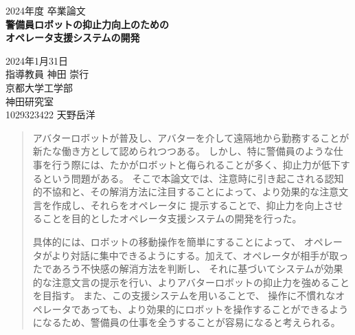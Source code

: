\documentclass[11pt,a4j]{jreport}
\begin{document}
\thispagestyle{empty}
\begin{center}

\vspace{20mm}
{\Large\noindent 2024年度 卒業論文}\\
\vspace{40mm}
{\huge\noindent\textbf{警備員ロボットの抑止力向上のための}}\\
\medskip
{\huge\noindent\textbf{オペレータ支援システムの開発}}\\
\vspace{\baselineskip}
\vspace{40mm}

{\Large\noindent
2024年1月31日\\
\vspace{\baselineskip}
指導教員 神田  崇行\\
\vspace{\baselineskip}
京都大学工学部\\
神田研究室\\
\vspace{\baselineskip}
1029323422 天野岳洋\\
}
\vspace{40mm}

\end{center}

\thispagestyle{empty}
\clearpage

\renewcommand{\abstractname}{要旨}

\begin{abstract}


アバターロボットが普及し、アバターを介して遠隔地から勤務することが新たな働き方として認められつつある。
しかし、特に警備員のような仕事を行う際には、たかがロボットと侮られることが多く、抑止力が低下するという問題がある。
そこで本論文では、注意時に引き起こされる認知的不協和と、その解消方法に注目することによって、より効果的な注意文言を作成し、それらをオペレータに
提示することで、抑止力を向上させることを目的としたオペレータ支援システムの開発を行った。

具体的には、ロボットの移動操作を簡単にすることによって、
オペレータがより対話に集中できるようにする。加えて、オペレータが相手が取ったであろう不快感の解消方法を判断し、
それに基づいてシステムが効果的な注意文言の提示を行い、よりアバターロボットの抑止力を強めることを目指す。
また、この支援システムを用いることで、
操作に不慣れなオペレータであっても、より効果的にロボットを操作することができるようになるため、警備員の仕事を全うすることが容易になると考えられる。
\end{abstract}
\end{document}
